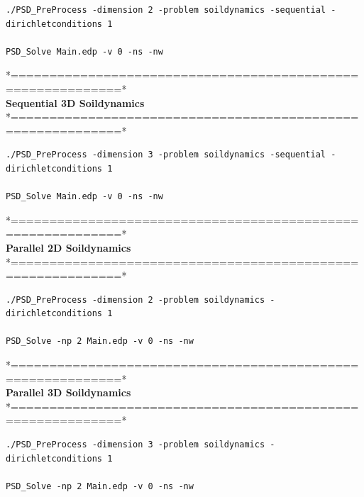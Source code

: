 \documentclass{report}
\begin{document}
\begin{lstlisting}[style=Linux]
./PSD_PreProcess -dimension 2 -problem soildynamics -sequential -dirichletconditions 1  

PSD_Solve Main.edp -v 0 -ns -nw
\end{lstlisting}
*============================================================*\\
\textbf{ Sequential 3D Soildynamics  }  \\                    
*============================================================*\\

\begin{lstlisting}[style=Linux]
./PSD_PreProcess -dimension 3 -problem soildynamics -sequential -dirichletconditions 1  

PSD_Solve Main.edp -v 0 -ns -nw
\end{lstlisting}
*============================================================*\\
\textbf{ Parallel 2D Soildynamics  }  \\                    
*============================================================*\\

\begin{lstlisting}[style=Linux]
./PSD_PreProcess -dimension 2 -problem soildynamics -dirichletconditions 1  

PSD_Solve -np 2 Main.edp -v 0 -ns -nw
\end{lstlisting}
*============================================================*\\
\textbf{ Parallel 3D Soildynamics  }     \\                 
*============================================================*\\

\begin{lstlisting}[style=Linux]
./PSD_PreProcess -dimension 3 -problem soildynamics -dirichletconditions 1  

PSD_Solve -np 2 Main.edp -v 0 -ns -nw 
\end{lstlisting}	
\end{document}

